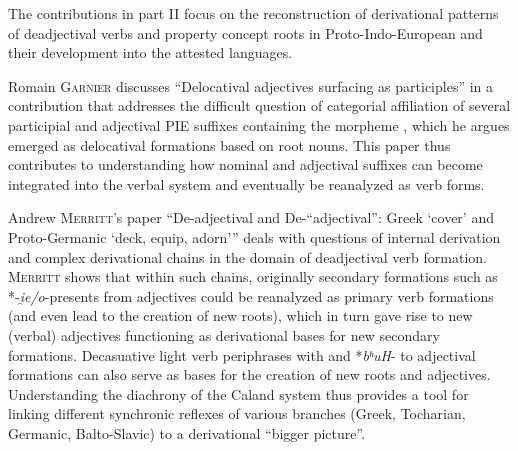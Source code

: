 \documentclass[output=paper,colorlinks,citecolor=brown]{langscibook}
\begin{document}
The contributions in part II focus on the reconstruction of derivational patterns of deadjectival verbs and property concept roots in Proto-Indo-European and their development into the attested languages. 

Romain \textsc{Garnier} discusses {``Delocatival adjectives surfacing as participles''} in a contribution that addresses the difficult question of categorial affiliation of several participial and adjectival PIE suffixes containing the morpheme , which he argues  emerged as delocatival formations based on root nouns. This paper thus contributes to understanding how nominal and adjectival suffixes can become integrated into the verbal system and eventually be reanalyzed as verb forms. 

Andrew \textsc{Merritt}'s paper {``De-adjectival and De-``adjectival'': Greek  `cover' and Proto-Germanic  `deck, equip, adorn'''}  deals with questions of internal derivation and complex derivational chains in the domain of deadjectival verb formation. \textsc{Merritt} shows that within such chains, originally secondary formations such as *-\textit{i̯e/o}-presents  from adjectives could be reanalyzed as primary verb formations  (and even lead to the creation of new roots), which in turn gave rise to new (verbal) adjectives  functioning as derivational bases for new secondary formations. Decasuative light verb periphrases with  and *\textit{bʰuH}- to adjectival formations can also serve as bases for the creation of new roots and adjectives. Understanding the diachrony of the Caland system  thus provides a tool for linking different synchronic reflexes of various branches (Greek, Tocharian, Germanic, Balto-Slavic) to a derivational ``bigger picture''. 
\end{document}
